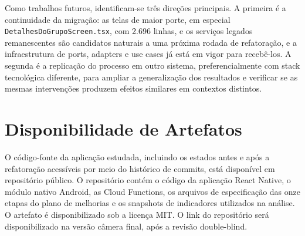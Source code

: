 \documentclass[sigconf,anonymous]{acmart}
\begin{document}
Como trabalhos futuros, identificam-se três direções principais. A primeira é a continuidade da migração: as telas de maior porte, em especial \texttt{DetalhesDoGrupoScreen.tsx}, com 2.696 linhas, e os serviços legados remanescentes são candidatos naturais a uma próxima rodada de refatoração, e a infraestrutura de ports, adapters e use cases já está em vigor para recebê-los. A segunda é a replicação do processo em outro sistema, preferencialmente com stack tecnológica diferente, para ampliar a generalização dos resultados e verificar se as mesmas intervenções produzem efeitos similares em contextos distintos.

\section*{Disponibilidade de Artefatos}
O c\'{o}digo-fonte da aplica\c{c}\~{a}o estudada, incluindo os estados antes e ap\'{o}s a refatora\c{c}\~{a}o acess\'{i}veis por meio do hist\'{o}rico de commits, est\'{a} dispon\'{i}vel em reposit\'{o}rio p\'{u}blico. O reposit\'{o}rio cont\'{e}m o c\'{o}digo da aplica\c{c}\~{a}o React Native, o m\'{o}dulo nativo Android, as Cloud Functions, os arquivos de especifica\c{c}\~{a}o das onze etapas do plano de melhorias e os snapshots de indicadores utilizados na an\'{a}lise. O artefato \'{e} disponibilizado sob a licen\c{c}a MIT. O link do reposit\'{o}rio ser\'{a} disponibilizado na vers\~{a}o c\^{a}mera final, ap\'{o}s a revis\~{a}o double-blind.



\end{document}
